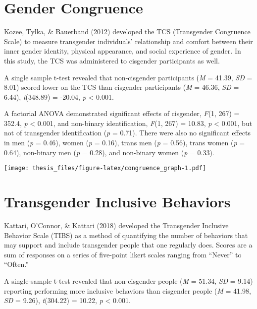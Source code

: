 \documentclass[12pt,twoside]{reedthesis}
\begin{document}
\hypertarget{gender-congruence}{%
\section{Gender Congruence}\label{gender-congruence}}

Kozee, Tylka, \& Bauerband (2012) developed the TCS (Transgender Congruence Scale) to measure transgender individuals' relationship and comfort between their inner gender identity, physical appearance, and social experience of gender. In this study, the TCS was administered to cisgender participants as well.

A single sample t-test revealed that non-cisgender participants (\emph{M} = 41.39, \emph{SD} = 8.01) scored lower on the TCS than cisgender participants (\emph{M} = 46.36, \emph{SD} = 6.44), \emph{t}(348.89) = -20.04, \emph{p} \textless{} 0.001.

A factorial ANOVA demonstrated significant effects of cisgender, \emph{F}(1, 267) = 352.4, \emph{p} \textless{} 0.001,
and non-binary identification, \emph{F}(1, 267) = 10.83, \emph{p} \textless{} 0.001,
but not of transgender identification (\emph{p} = 0.71).
There were also no significant effects in men (\emph{p} = 0.46), women (\emph{p} = 0.16), trans men (\emph{p} = 0.56), trans women (\emph{p} = 0.64), non-binary men (\emph{p} = 0.28), and non-binary women (\emph{p} = 0.33).

\texttt{[image: thesis\_files/figure-latex/congruence\_graph-1.pdf]}

\hypertarget{transgender-inclusive-behaviors}{%
\section{Transgender Inclusive Behaviors}\label{transgender-inclusive-behaviors}}

Kattari, O'Connor, \& Kattari (2018) developed the Transgender Inclusive Behavior Scale (TIBS) as a method of quantifying the number of behaviors that may support and include transgender people that one regularly does. Scores are a sum of responses on a series of five-point likert scales ranging from ``Never'' to ``Often.''

A single-sample t-test revealed that non-cisgender people (\emph{M} = 51.34, \emph{SD} = 9.14) reporting performing more inclusive behaviors than cisgender people (\emph{M} = 41.98, \emph{SD} = 9.26), \emph{t}(304.22) = 10.22, \emph{p} \textless{} 0.001.
\end{document}
